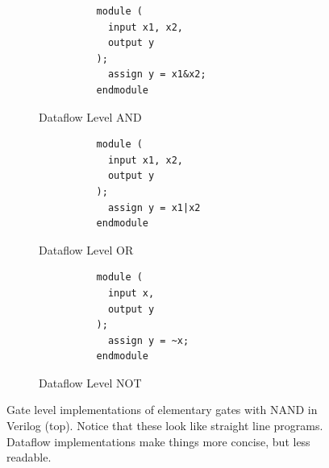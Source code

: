 \begin{definition}
\begin{figure}[H]
      \begin{subfigure}[b]{0.32\textwidth}
        \centering
        \begin{lstlisting}
          module (
            input x1, x2, 
            output y
          ); 
            assign y = x1&x2;
          endmodule
        \end{lstlisting}
        \caption{Dataflow Level AND}
      \end{subfigure}
      \hfill 
      \begin{subfigure}[b]{0.32\textwidth}
        \centering
        \begin{lstlisting}
          module (
            input x1, x2, 
            output y
          ); 
            assign y = x1|x2
          endmodule
        \end{lstlisting}
        \caption{Dataflow Level OR}
      \end{subfigure}
      \hfill 
      \begin{subfigure}[b]{0.32\textwidth}
        \centering
        \begin{lstlisting}
          module (
            input x, 
            output y
          ); 
            assign y = ~x;
          endmodule
        \end{lstlisting}
        \caption{Dataflow Level NOT}
      \end{subfigure}

      \caption{Gate level implementations of elementary gates with NAND in Verilog (top). Notice that these look like straight line programs. Dataflow implementations make things more concise, but less readable.}
    \end{figure}
  \end{definition}


